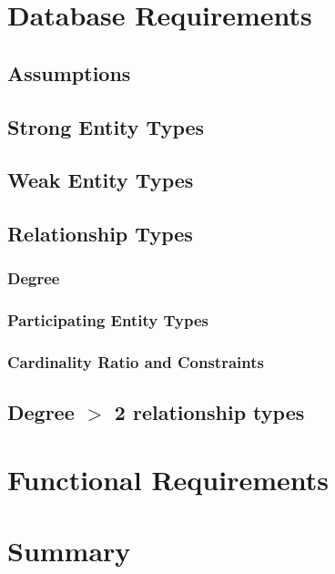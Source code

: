 \documentclass{article}
\begin{document}
\section{Database Requirements}
    \subsection{Assumptions}
    \subsection{Strong Entity Types}
    \subsection{Weak Entity Types}
    \subsection{Relationship Types}
        \subsubsection{Degree}
        \subsubsection{Participating Entity Types}
        \subsubsection{Cardinality Ratio and Constraints}
        \subsection{Degree $>$ 2 relationship types}

\section{Functional Requirements}

\section{Summary}
\end{document}
